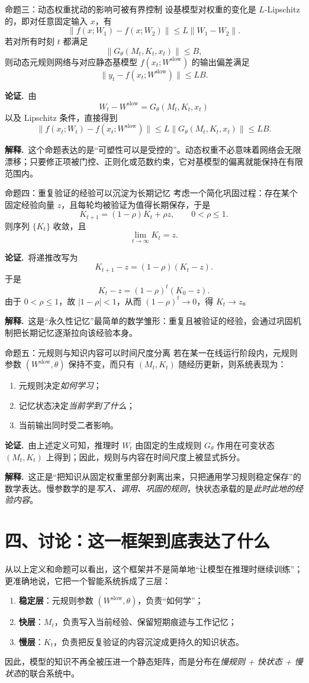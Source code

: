 \documentclass[11pt]{article}
\newcommand{\Explain}{\par\smallskip\noindent\textbf{解释.}\ }
\newcommand{\Proof}{\par\smallskip\noindent\textbf{论证.}\ }
\begin{document}
\begin{propbox}{命题三：动态权重扰动的影响可被有界控制}
设基模型对权重的变化是 $L$-Lipschitz 的，即对任意固定输入 $x$，有
\[
 \|f(x;W_1)-f(x;W_2)\| \le L\|W_1-W_2\|.
\]
若对所有时刻 $t$ 都满足
\[
 \|G_\theta(M_t,K_t,x_t)\| \le B,
\]
则动态元规则网络与对应静态基模型 $f(x_t;W^{\mathrm{slow}})$ 的输出偏差满足
\[
 \|y_t - f(x_t;W^{\mathrm{slow}})\| \le LB.
\]
\end{propbox}
\Proof 由
\[
 W_t - W^{\mathrm{slow}} = G_\theta(M_t,K_t,x_t)
\]
以及 Lipschitz 条件，直接得到
\[
 \|f(x_t;W_t)-f(x_t;W^{\mathrm{slow}})\| \le L\|G_\theta(M_t,K_t,x_t)\| \le LB.
\]
\Explain 这个命题表达的是“可塑性可以是受控的”。动态权重不必意味着网络会无限漂移；只要修正项被门控、正则化或范数约束，它对基模型的偏离就能保持在有限范围内。

\begin{propbox}{命题四：重复验证的经验可以沉淀为长期记忆}
考虑一个简化巩固过程：存在某个固定经验向量 $z$，且每轮均被验证为值得长期保存，于是
\[
 K_{t+1}=(1-\rho)K_t + \rho z,
\qquad 0<\rho\le 1.
\]
则序列 $\{K_t\}$ 收敛，且
\[
 \lim_{t\to\infty} K_t = z.
\]
\end{propbox}
\Proof 将递推改写为
\[
 K_{t+1}-z = (1-\rho)(K_t-z).
\]
于是
\[
 K_t-z = (1-\rho)^t (K_0-z).
\]
由于 $0<\rho\le 1$，故 $|1-\rho|<1$，从而 $(1-\rho)^t\to 0$，得 $K_t\to z$。
\Explain 这是“永久性记忆”最简单的数学雏形：重复且被验证的经验，会通过巩固机制把长期记忆逐渐拉向该经验本身。
\begin{propbox}{命题五：元规则与知识内容可以时间尺度分离}
若在某一在线运行阶段内，元规则参数 $(W^{\mathrm{slow}},\theta)$ 保持不变，而只有 $(M_t,K_t)$ 随经历更新，则系统表现为：
\begin{enumerate}
  \item 元规则决定\emph{如何学习}；
  \item 记忆状态决定\emph{当前学到了什么}；
  \item 当前输出同时受二者影响。
\end{enumerate}
\end{propbox}
\Proof 由上述定义可知，推理时 $W_t$ 由固定的生成规则 $G_\theta$ 作用在可变状态 $(M_t,K_t)$ 上得到；因此，规则与内容在时间尺度上被显式拆分。
\Explain 这正是“把知识从固定权重里部分剥离出来，只把通用学习规则稳定保存”的数学表达。慢参数学的是\emph{写入、调用、巩固的规则}，快状态承载的是\emph{此时此地的经验内容}。

\section*{四、讨论：这一框架到底表达了什么}
从以上定义和命题可以看出，这个框架并不是简单地“让模型在推理时继续训练”；更准确地说，它把一个智能系统拆成了三层：
\begin{enumerate}
  \item \textbf{稳定层}：元规则参数 $(W^{\mathrm{slow}},\theta)$，负责“如何学”；
  \item \textbf{快层}：$M_t$，负责写入当前经验、保留短期痕迹与工作记忆；
  \item \textbf{慢层}：$K_t$，负责把反复验证的内容沉淀成更持久的知识状态。
\end{enumerate}
因此，模型的知识不再全被压进一个静态矩阵，而是分布在\emph{慢规则 + 快状态 + 慢状态}的联合系统中。
\end{document}
